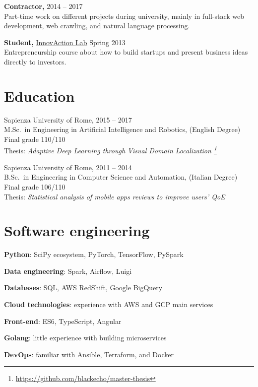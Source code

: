 \documentclass[margin]{res}
\begin{document}
\begin{resume}
            {\bf Contractor,} \hfill 2014 -- 2017\\
            Part-time work on different projects during university, mainly in full-stack web development, web crawling, and natural language processing.

            {\bf Student,} \href{http://www.innovactionlab.org/?lang=en}{InnovAction Lab} \hfill Spring 2013\\
            Entrepreneurship course about how to build startups and present business ideas directly to investors.

        \section{Education}
            Sapienza University of Rome, \hfill 2015 -- 2017 \\
            M.Sc.\ in Engineering in Artificial Intelligence and Robotics, (English Degree) \\
            Final grade 110/110 \\
            Thesis: \textit{Adaptive Deep Learning through Visual Domain Localization \footnote{\url{https://github.com/blackecho/master-thesis}}}

            Sapienza University of Rome, \hfill 2011 -- 2014 \\
            B.Sc.\ in Engineering in Computer Science and Automation, (Italian Degree) \\
            Final grade 106/110 \\
            Thesis: \textit{Statistical analysis of mobile apps reviews to improve users' QoE}

        \section{Software engineering}
        \begin{description}
            \item \textbf{Python}: SciPy ecosystem, PyTorch, TensorFlow, PySpark
            \item \textbf{Data engineering}: Spark, Airflow, Luigi
            \item \textbf{Databases}: SQL, AWS RedShift, Google BigQuery
            \item \textbf{Cloud technologies}: experience with AWS and GCP main services
            \item \textbf{Front-end}: ES6, TypeScript, Angular
            \item \textbf{Golang}: little experience with building microservices
            \item \textbf{DevOps}: familiar with Ansible, Terraform, and Docker
        \end{description}


\end{resume}
\end{document}

